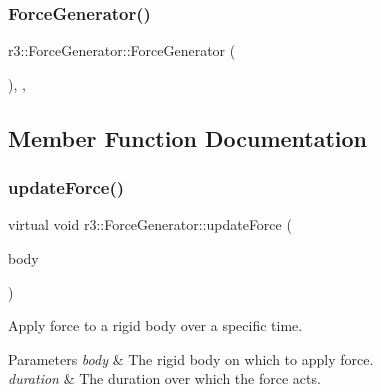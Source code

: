 \mbox{\label{classr3_1_1_force_generator_a7b21e48ccca59631975e0621057a1035}} 
\subsubsection{\texorpdfstring{Force\+Generator()}{ForceGenerator()}}
{\footnotesize\ttfamily r3\+::\+Force\+Generator\+::\+Force\+Generator (\begin{DoxyParamCaption}{ }\end{DoxyParamCaption})\hspace{0.3cm}{\ttfamily [explicit]}, {\ttfamily [protected]}, {\ttfamily [default]}}



\subsection{Member Function Documentation}
\mbox{\label{classr3_1_1_force_generator_a59deb54721cdcc6e33fabfb1f9a3fb27}} 
\subsubsection{\texorpdfstring{update\+Force()}{updateForce()}}
{\footnotesize\ttfamily virtual void r3\+::\+Force\+Generator\+::update\+Force (\begin{DoxyParamCaption}\item[{\mbox{\hyperlink{classr3_1_1_rigid_body}{Rigid\+Body}} $\ast$}]{body }\end{DoxyParamCaption})\hspace{0.3cm}{\ttfamily [pure virtual]}}



Apply force to a rigid body over a specific time. 


\begin{DoxyParams}{Parameters}
{\em body} & The rigid body on which to apply force. \\
\hline
{\em duration} & The duration over which the force acts. \\
\hline
\end{DoxyParams}


